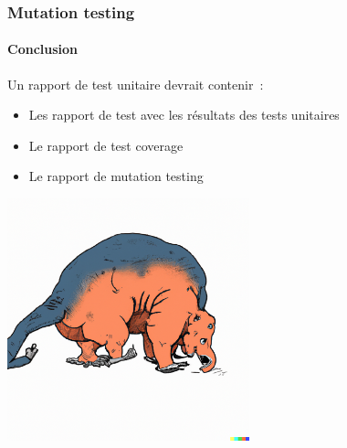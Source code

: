 \documentclass{beamer}
\begin{document}
    \begin{frame}
        \frametitle{Mutation testing}
        \framesubtitle{Conclusion}
        \transdissolve
        Un rapport de test unitaire devrait contenir~:
        \begin{itemize}
            \item Les rapport de test avec les résultats des tests unitaires
            \item Le rapport de test coverage
            \item Le rapport de mutation testing
        \end{itemize}
        \centering
        \includegraphics[width=7cm]{image/mutant}
    \end{frame}
\end{document}
